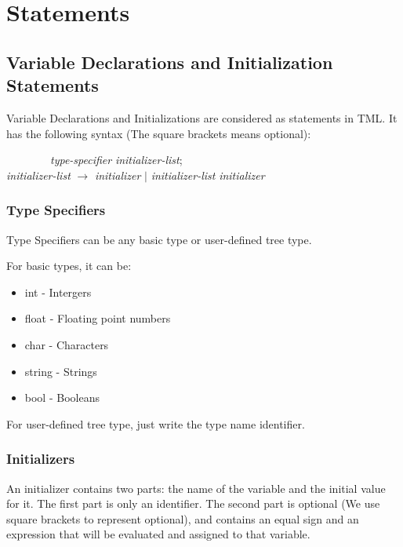 \documentclass[12pt,psfig,a4]{article}
\begin{document}
\section{Statements}

\subsection{Variable Declarations and Initialization Statements}
Variable Declarations and Initializations are considered as statements in TML. It has the following syntax (The square brackets means optional):

\begin{code}
\begin{tabbing}
~~~~~~~~\= \textsl{type-specifier} \textsl{initializer-list}; \\
\> \textsl{initializer-list}  $\rightarrow$ \textsl{initializer} $\mid$ \textsl{initializer-list} \textsl{initializer}
\end{tabbing}
\end{code}

\subsubsection{Type Specifiers}
\label{ts}
Type Specifiers can be any basic type or user-defined tree type.

For basic types, it can be:
\begin{itemize}
\setlength{\itemsep}{0pt}
\setlength{\parskip}{0pt}
\item int - Intergers
\item float - Floating point numbers
\item char - Characters
\item string - Strings
\item bool - Booleans
\end{itemize}

For user-defined tree type, just write the type name identifier.

\subsubsection{Initializers}
An initializer contains two parts: the name of the variable and the initial value for it. The first part is only an identifier. The second part is optional (We use square brackets to represent optional), and contains an equal sign and an expression that will be evaluated and assigned to that variable.
\end{document}
